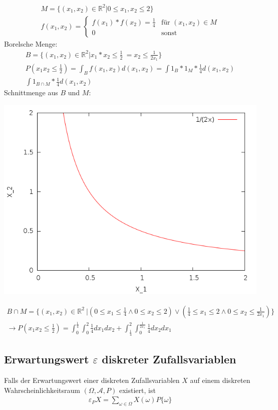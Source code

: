 \documentclass{article}
\begin{document}
\begin{align}
	M = \{(x_1, x_2) \in \mathbb{R}^2 | 0 \leq x_1,x_2 \leq 2\}\\
	f(x_1,x_2) =
	\begin{cases}
		f(x_1)*f(x_2) = \frac{1}{4} & \text{f\"ur } (x_1,x_2) \in M \\
		0 & \text{sonst}
	\end{cases}
\end{align}
Borelsche Menge:
\begin{align}
	B = \{(x_1, x_2) \in \mathbb{R}^2 | x_1*x_2 \leq \frac{1}{2}\ = x_2 \leq \frac{1}{2 x_1}\} \\
	P(x_1x_2 \leq \frac{1}{2}) = \int_B f(x_1, x_2) d(x_1, x_2) = \int 1_B*1_M*\frac{1}{4}
	d(x_1,x_2)\\
	\int 1_{B \cap M} * \frac{1}{4} d(x_1,x_2)
\end{align}
Schnittmenge aus $B$ und $M$:
\begin{center}
	\includegraphics[scale=0.3]{graph.png}
\end{center}
\begin{align}
	B \cap M = \{(x_1, x_2) \in \mathbb{R}^2\ | (0 \leq x_1 \leq \frac{1}{4} \wedge 0 \leq x_2 \leq
	2) \vee (\frac{1}{4} \leq x_1 \leq 2 \wedge 0 \leq x_2 \leq \frac{1}{2x_1})\}\\
	\longrightarrow
	P(x_1x_2 \leq \frac{1}{2}) = \int^{\frac{1}{4}}_{0} \int^2_0 \frac{1}{4} dx_1dx_2
	+ \int^2_{\frac{1}{4}} \int^{\frac{1}{2x_1}}_0 \frac{1}{4} dx_2 dx_1
\end{align}
\subsection{Erwartungswert $\varepsilon$ diskreter Zufallsvariablen}
Falls der Erwartungswert einer diskreten Zufallsvariablen $X$ auf
einem diskreten Wahrscheinlichkeitsraum $(\Omega, \mathcal{A}, P)$ existiert,
ist
\begin{align}
	\varepsilon_P X = \sum_{\omega \in \Omega} X(\omega)P\{\omega\}
\end{align}
\end{document}
